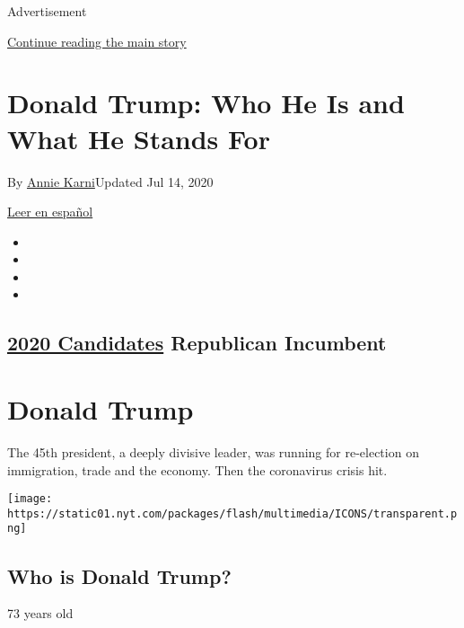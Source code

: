 Advertisement

\protect\hyperlink{after-top}{Continue reading the main story}

\hypertarget{donald-trump-who-he-is-and-what-he-stands-for}{%
\section{Donald Trump: Who He Is and What He Stands
For}\label{donald-trump-who-he-is-and-what-he-stands-for}}

By \href{https://www.nytimes.com/by/annie-karni}{Annie Karni}Updated Jul
14, 2020

\href{https://www.nytimes.com/es/interactive/2020/espanol/estados-unidos/donald-trump-elecciones.html}{Leer
en español}

\begin{itemize}
\item
\item
\item
\item
\end{itemize}

\hypertarget{2020-candidates--republican-incumbent-}{%
\subsection{\texorpdfstring{\href{https://www.nytimes.com/interactive/2019/us/politics/2020-presidential-candidates.html}{2020
Candidates} Republican Incumbent
}{2020 Candidates  Republican Incumbent }}\label{2020-candidates--republican-incumbent-}}

\hypertarget{donald-trump}{%
\section{Donald Trump}\label{donald-trump}}

The 45th president, a deeply divisive leader, was running for
re-election on immigration, trade and the economy. Then the coronavirus
crisis hit.

\texttt{[image: https://static01.nyt.com/packages/flash/multimedia/ICONS/transparent.png]}

\hypertarget{who-is-donald-trump}{%
\subsection{Who is Donald Trump?}\label{who-is-donald-trump}}

73 years old

